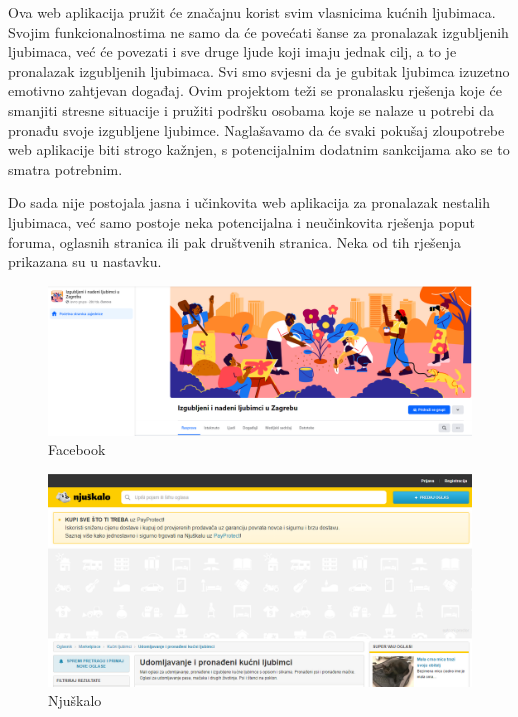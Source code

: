		Ova web aplikacija pružit će značajnu korist svim vlasnicima kućnih ljubimaca. Svojim funkcionalnostima ne samo da će povećati šanse za pronalazak izgubljenih ljubimaca, već će povezati i sve druge ljude koji imaju jednak cilj, a to je pronalazak izgubljenih ljubimaca. Svi smo svjesni da je gubitak ljubimca izuzetno emotivno zahtjevan događaj. Ovim projektom teži se pronalasku rješenja koje će smanjiti stresne situacije i pružiti podršku osobama koje se nalaze u potrebi da pronađu svoje izgubljene ljubimce. Naglašavamo da će svaki pokušaj zloupotrebe web aplikacije biti strogo kažnjen, s potencijalnim dodatnim sankcijama ako se to smatra potrebnim.
		
		Do sada nije postojala jasna i učinkovita web aplikacija za pronalazak nestalih ljubimaca, već samo postoje neka potencijalna i neučinkovita rješenja poput foruma, oglasnih stranica ili pak društvenih stranica. Neka od tih rješenja prikazana su u nastavku.
	
		\begin{figure}[H]
			\centering
			\includegraphics[scale=0.3]{slike/Facebook-nestaliLjubimci.PNG}
			\caption{Facebook}
			\label{fig:promjene}
		\end{figure}
	
		\begin{figure}[H]
			\centering
			\includegraphics[scale=0.3]{slike/Njuskalo-nestaliLjubimci.PNG}
			\caption{Njuškalo}
			\label{fig:promjene}
		\end{figure}
		
